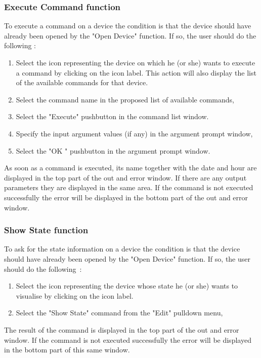 \subsubsection{Execute Command function}

To execute a command on a device the condition is that the device should have
already been opened by the "Open Device" function. If so, the user should do the
following :
\begin{enumerate}
\item
Select the icon representing the device on which he (or she) wants to execute
a command by clicking on the icon label. This action will also display the 
list of the available commands for that device.
\item
Select the command name in the proposed list of available commands,
\item
Select the "Execute" pushbutton in the command list window.
\item
Specify the input argument values (if any) in the argument prompt window,
\item
Select the "OK " pushbutton in the argument prompt window.
\end{enumerate}

As soon as a command is executed, its name together with the date and hour are
displayed in the top part of the out and error window. If there are any output
parameters they are displayed in the same area.
If the command is not executed successfully the error will be displayed in the 
bottom part of the out and error window.

\subsubsection{Show State function}

To ask for the state information on a device the condition is that the device
should have already been opened by the "Open Device" function. If so, the user
should do the following~:
\begin{enumerate}
\item
Select the icon representing the device whose state he (or she) wants to
visualise by clicking on the icon label.
\item
Select the "Show State" command from the "Edit" pulldown menu,
\end{enumerate}

The result of the command is displayed in the top part of the out and error 
window.
If the command is not executed successfully the error will be displayed in the 
bottom part of this same window. 

